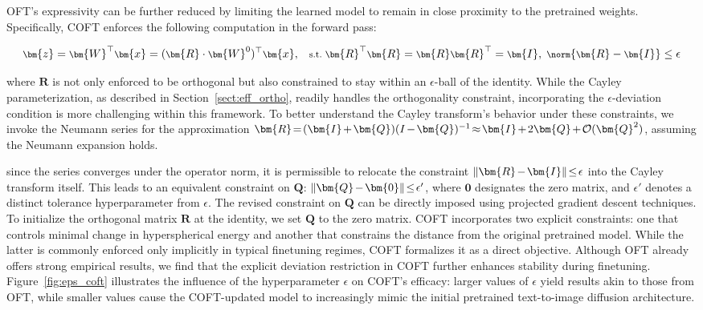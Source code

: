 OFT’s expressivity can be further reduced by limiting the learned model to remain in close proximity to the pretrained weights. Specifically, COFT enforces the following computation in the forward pass:

\begin{equation}\label{eq:coft_general}
    \footnotesize
    \bm{z}=\bm{W}^\top\bm{x}=(\bm{R}\cdot\bm{W}^0)^\top\bm{x},~~~\text{s.t.}~\bm{R}^\top\bm{R}=\bm{R}\bm{R}^\top=\bm{I},~\norm{\bm{R}-\bm{I}}\leq \epsilon
\end{equation}

where $\bm{R}$ is not only enforced to be orthogonal but also constrained to stay within an $\epsilon$-ball of the identity. While the Cayley parameterization, as described in Section~\ref{sect:eff_ortho}, readily handles the orthogonality constraint, incorporating the $\epsilon$-deviation condition is more challenging within this framework. To better understand the Cayley transform’s behavior under these constraints, we invoke the Neumann series for the approximation $\thickmuskip=2mu \medmuskip=2mu \bm{R}=(\bm{I}+\bm{Q})(I-\bm{Q})^{-1} \approx \bm{I}+2\bm{Q}+\mathcal{O}(\bm{Q}^2)$, assuming the Neumann expansion holds.

since the series converges under the operator norm, it is permissible to relocate the constraint $\thickmuskip=2mu \medmuskip=2mu\|\bm{R}-\bm{I}\|\leq\epsilon$ into the Cayley transform itself. This leads to an equivalent constraint on $\bm{Q}$: $\thickmuskip=2mu \medmuskip=2mu \|\bm{Q}-\bm{0}\|\leq\epsilon'$, where $\bm{0}$ designates the zero matrix, and $\epsilon'$ denotes a distinct tolerance hyperparameter from $\epsilon$. The revised constraint on $\bm{Q}$ can be directly imposed using projected gradient descent techniques. To initialize the orthogonal matrix $\bm{R}$ at the identity, we set $\bm{Q}$ to the zero matrix. COFT incorporates two explicit constraints: one that controls minimal change in hyperspherical energy and another that constrains the distance from the original pretrained model. While the latter is commonly enforced only implicitly in typical finetuning regimes, COFT formalizes it as a direct objective. Although OFT already offers strong empirical results, we find that the explicit deviation restriction in COFT further enhances stability during finetuning. Figure~\ref{fig:eps_coft} illustrates the influence of the hyperparameter $\epsilon$ on COFT's efficacy: larger values of $\epsilon$ yield results akin to those from OFT, while smaller values cause the COFT-updated model to increasingly mimic the initial pretrained text-to-image diffusion architecture.

